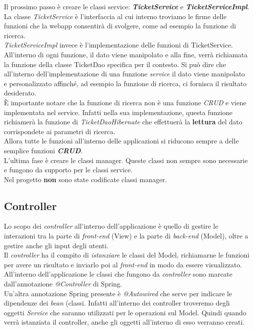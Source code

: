 \noindent
Il prossimo passo è creare le classi service: \textit{\textbf{TicketService}} e \textit{\textbf{TicketServiceImpl}}.\\
La classe \textit{TicketService} è l'interfaccia al cui interno troviamo le firme delle funzioni che la webapp consentirà di svolgere, come ad esempio la funzione di ricerca. \\
\textit{TicketServiceImpl} invece è l'implementazione delle funzioni di TicketService. All'interno di ogni funzione, il dato viene manipolato e alla fine, verrà richiamata la funzione della classe TicketDao specifica per il contesto. 
Si può dire che all'interno dell'implementazione di una funzione \textit{service} il dato viene manipolato e personalizzato affinché, ad esempio la funzione di ricerca, ci fornisca il risultato desiderato.\\

\noindent
È importante notare che la funzione di ricerca non è una funzione \textit{CRUD} e viene implementata nel service. Infatti nella sua implementazione, questa funzione richiamerà la funzione di \textit{TicketDaoHibernate} che effettuerà la \textbf{lettura} del dato corrispondete ai parametri di ricerca.\\

\noindent
Allora tutte le funzioni all'interno delle applicazioni si riducono sempre a delle semplice funzioni \textit{\textbf{CRUD}}.\\

\noindent
L'ultima fase è creare le classi manager. Queste classi non sempre sono necessarie e fungono da supporto per le classi service. \\
Nel progetto \textbf{non} sono state codificate classi manager.

\subsection*{Controller}
Lo scopo dei \textit{controller} all'interno dell'applicazione è quello di gestire le interazioni tra la parte di \textit{front-end} (View) e la parte di \textit{back-end} (Model), oltre a gestire anche gli input degli utenti.\\

\noindent
Il \textit{controller} ha il compito di \textit{istanziare} le classi del Model, richiamarne le funzioni per avere un risultato e inviarlo poi al \textit{front-end} in modo da essere visualizzato.
All'interno dell'applicazione le classi che fungono da \textit{controller} sono marcate dall'annotazione \textit{@Controller} di Spring.\\
Un'altra annotazione Spring presente è \textit{@Autowired} che serve per indicare le dipendenze dei \textit{bean} (classi. Infatti all'interno dei controller troveremo degli oggetti \textit{Service} che saranno utilizzati per le operazioni sul Model. Quindi quando verrà istanziata il controller, anche gli oggetti all'interno di esso verranno creati.\\


